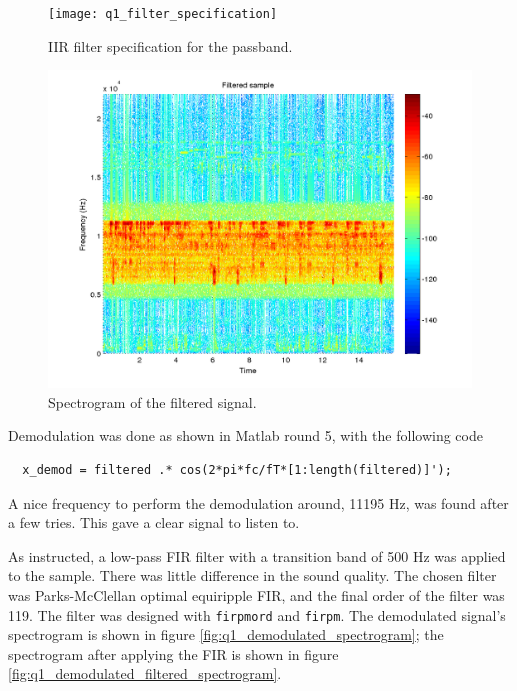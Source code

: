 \begin{figure}
  \begin{center}
    \hspace*{-1in}
    \texttt{[image: q1\_filter\_specification]}
    \caption{IIR filter specification for the
      passband. \label{fig:q1_filter_specification}}
  \end{center}  
\end{figure}

\begin{figure}
  \begin{center}
    \hspace*{-1in}
    \includegraphics[width=180mm]{q1_filtered_spectrogram}
    \caption{Spectrogram of the filtered signal. 
      \label{fig:q1_filtered_spectrogram}}
  \end{center}  
\end{figure}

Demodulation was done as shown in Matlab round 5, with the following code
\begin{verbatim}
  x_demod = filtered .* cos(2*pi*fc/fT*[1:length(filtered)]');
\end{verbatim}

A nice frequency to perform the demodulation around, 11195 Hz, was found
after a few tries.  This gave a clear signal to listen to.

As instructed, a low-pass FIR filter with a transition band of 500 Hz
was applied to the sample.  There was little difference in the sound
quality.  The chosen filter was Parks-McClellan optimal equiripple FIR,
and the final order of the filter was 119.  The filter was designed with
{\tt firpmord} and {\tt firpm}.  The demodulated signal's spectrogram is
shown in figure \ref{fig:q1_demodulated_spectrogram}; the spectrogram
after applying the FIR is shown in
figure \ref{fig:q1_demodulated_filtered_spectrogram}.

